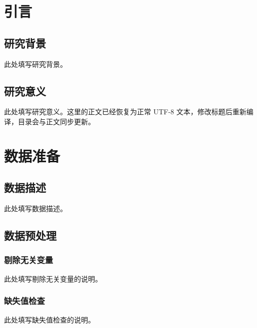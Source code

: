 \documentclass[12pt,a4paper,UTF8]{ctexart}
\begin{document}
\cover
\maketitle
\begin{abstract}
此处填写摘要正文。摘要环境现在支持普通段落自动换行，直接连续输入中文内容即可，不需要手动插入换行命令；如果摘要较长，LaTeX 会按照当前版心宽度自动断行并分页。

\end{abstract}

\clearpage
\tableofcontents

\clearpage
\section{引言}

\subsection{研究背景}
此处填写研究背景。\cite{gu2020xgboost}

\subsection{研究意义}
此处填写研究意义。这里的正文已经恢复为正常 UTF-8 文本，修改标题后重新编译，目录会与正文同步更新。

\section{数据准备}

\subsection{数据描述}
此处填写数据描述。

\subsection{数据预处理}

\subsubsection{剔除无关变量}
此处填写剔除无关变量的说明。

\subsubsection{缺失值检查}
此处填写缺失值检查的说明。
\end{document}
